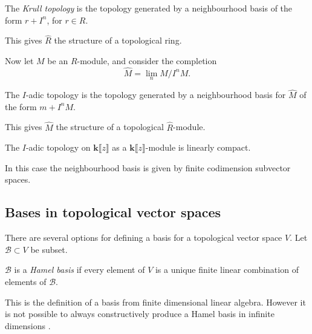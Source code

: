         \begin{defn}
        The \emph{Krull topology} is the topology generated by a neighbourhood basis of the form \(r + I^n\), for \(r\in R\). 
        \end{defn}
        This gives \( \widehat{R} \) the structure of a topological ring.
    
    
        Now let \(M\) be an \(R\)-module, 
        and consider the completion \[\widehat{M} = \lim_n M/I^n M.\]
        \begin{defn}
        The \(I\)-adic topology is the topology generated by a neighbourhood basis for \(\widehat{M}\) of the form \(m + I^n M\). 
        \end{defn}    
        This gives \(\widehat{M}\) the structure of a topological \(\widehat{R}\)-module.
        
        \begin{thm} The \(I \)-adic topology on \( \mathbf{k} \lBrack z \rBrack\) as a \(  \mathbf{k}\lBrack z \rBrack\)-module is linearly compact.
        \end{thm}
   
        In this case the neighbourhood basis is given by finite codimension subvector spaces.
        
        \fi 
   
   
        
        \iffalse 
        
        \subsection{Bases in topological vector spaces}
        
        There are several options for defining a basis for a topological vector space \(V\). Let \( \mathcal{B} \subset V\) be subset.
        
        \begin{defn}
        \( \mathcal{B}\) is a \emph{Hamel basis} if every element of \(  V\) is a unique finite linear combination of elements of \( \mathcal{B}\).
        \end{defn}
        This is the definition of a basis from finite dimensional linear algebra. However it is not possible to always constructively produce a Hamel basis in infinite dimensions  \cite{basis_vect}.
        
